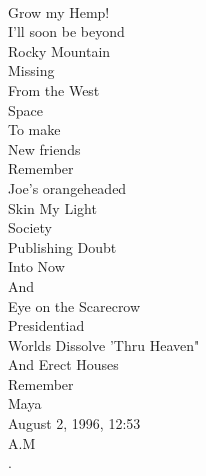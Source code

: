 \documentclass[smalldemyvopaper,11pt,twoside,onecolumn,openright,extrafontsizes]{memoir}
\begin{document}
\\Grow my Hemp!
\\I'll soon be beyond
\\Rocky Mountain
\\Missing
\\From the West
\\Space
\\To make
\\New friends
\\Remember
\\Joe's orangeheaded
\\Skin My Light
\\Society
\\Publishing Doubt
\\Into Now
\\And
\\Eye on the Scarecrow
\\Presidentiad
\\Worlds Dissolve 'Thru Heaven"
\\And Erect Houses
\\Remember
\\Maya
\\August 2, 1996, 12:53
\\A.M
\\.
\end{document}
